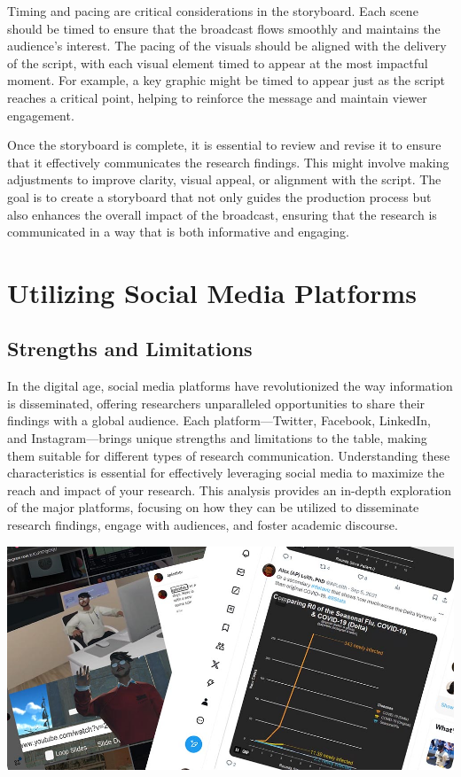 \documentclass[
]{book}
\begin{document}
Timing and pacing are critical considerations in the storyboard. Each scene should be timed to ensure that the broadcast flows smoothly and maintains the audience's interest. The pacing of the visuals should be aligned with the delivery of the script, with each visual element timed to appear at the most impactful moment. For example, a key graphic might be timed to appear just as the script reaches a critical point, helping to reinforce the message and maintain viewer engagement.

Once the storyboard is complete, it is essential to review and revise it to ensure that it effectively communicates the research findings. This might involve making adjustments to improve clarity, visual appeal, or alignment with the script. The goal is to create a storyboard that not only guides the production process but also enhances the overall impact of the broadcast, ensuring that the research is communicated in a way that is both informative and engaging.

\section{Utilizing Social Media Platforms}\label{utilizing-social-media-platforms}

\subsection*{Strengths and Limitations}\label{strengths-and-limitations}

In the digital age, social media platforms have revolutionized the way information is disseminated, offering researchers unparalleled opportunities to share their findings with a global audience. Each platform---Twitter, Facebook, LinkedIn, and Instagram---brings unique strengths and limitations to the table, making them suitable for different types of research communication. Understanding these characteristics is essential for effectively leveraging social media to maximize the reach and impact of your research. This analysis provides an in-depth exploration of the major platforms, focusing on how they can be utilized to disseminate research findings, engage with audiences, and foster academic discourse.

\includegraphics[width=1\linewidth,height=\textheight,keepaspectratio]{images/fig092.jpg}
\end{document}
